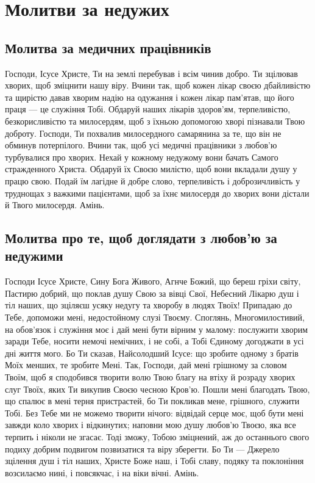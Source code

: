 \documentclass[chapters.tex]{subfiles}
\begin{document}
\chapter{Молитви за недужих}
\section{Молитва за медичних працівників}
Господи, Ісусе Христе, Ти на землі перебував і всім чинив добро. Ти зцілював хворих, щоб зміцнити нашу віру. Вчини так, щоб кожен лікар своєю дбайливістю та щирістю давав хворим надію на одужання і кожен лікар пам’ятав, що його праця — це служіння Тобі. Обдаруй наших лікарів здоров’ям, терпеливістю, безкорисливістю та милосердям, щоб з їхньою допомогою хворі пізнавали Твою доброту. Господи, Ти похвалив милосердного самарянина за те, що він не обминув потерпілого. Вчини так, щоб усі медичні працівники з любов’ю турбувалися про хворих. Нехай у кожному недужому вони бачать Самого стражденного Христа. Обдаруй їх Своєю милістю, щоб вони вкладали душу у працю свою. Подай їм лагідне й добре слово, терпеливість і доброзичливість у труднощах з важкими пацієнтами, щоб за їхнє милосердя до хворих вони дістали й Твого милосердя. Амінь.

\section{Молитва про те, щоб доглядати з любов’ю за недужими}
Господи Ісусе Христе, Сину Бога Живого, Агнче Божий, що береш гріхи світу, Пастирю добрий, що поклав душу Свою за вівці Свої, Небесний Лікарю душ і тіл наших, що зціляєш усяку недугу та хворобу в людях Твоїх! Припадаю до Тебе, допоможи мені, недостойному слузі Твоєму. Споглянь, Многомилостивий, на обов’язок і служіння моє і дай мені бути вірним у малому: послужити хворим заради Тебе, носити немочі немічних, і не собі, а Тобі Єдиному догоджати в усі дні життя мого. Бо Ти сказав, Найсолодший Ісусе: що зробите одному з братів Моїх менших, те зробите Мені. Так, Господи, дай мені грішному за словом Твоїм, щоб я сподобився творити волю Твою благу на втіху й розраду хворих слуг Твоїх, яких Ти викупив Своєю чесною Кров’ю. Пошли мені благодать Твою, що спалює в мені терня пристрастей, бо Ти покликав мене, грішного, служити Тобі. Без Тебе ми не можемо творити нічого: відвідай серце моє, щоб бути мені завжди коло хворих і відкинутих; наповни мою душу любов’ю Твоєю, яка все терпить і ніколи не згасає. Тоді зможу, Тобою зміцнений, аж до останнього свого подиху добрим подвигом позвизатися та віру зберегти. Бо Ти — Джерело зцілення душ і тіл наших, Христе Боже наш, і Тобі славу, подяку та поклоніння возсилаємо нині, і повсякчас, і на віки вічні. Амінь.
\end{document}
